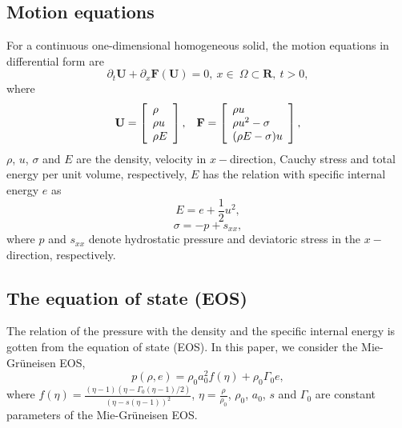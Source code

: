 \documentclass{article}
\numberwithin{equation}{section}
\numberwithin{table}{section}
\begin{document}
\subsection{Motion equations}
For  a continuous one-dimensional homogeneous solid, the motion equations  in differential form are
\begin{equation*}
\partial_t \mathbf{{U}} + \partial _x \bm{F}(\mathbf{{U}}) = 0, \   x \in \   \Omega \subset \mathbf{R}, \  t>0,
\end{equation*}
where
\begin{equation}
  \mathbf{U} = \left[ \begin{array}{l}
      \rho \\
      \rho u \\
      \rho  E \\
    \end{array}
  \right],
  \hspace{0.3cm}
  \mathbf{F} = \left[ \begin{array}{l}
      \rho u \\
      \rho u^2 -\sigma\\
      (\rho E -\sigma)u\\
  \end{array} \right],
\end{equation}
$\rho$, $u$, $\sigma$ and $E$ are  the density, velocity in $x-$direction, Cauchy stress and total energy per unit volume, respectively, $E$ has the relation with specific internal energy $e$ as
\begin{equation} \label{te1}
  E = e+\frac{1}{2}u^2,
\end{equation}
\begin{equation}\label{sigma1}
  \sigma = -p +s_{xx},
\end{equation}
where $p$ and $s_{xx}$ denote hydrostatic pressure and deviatoric stress in the $x-$ direction, respectively.

\subsection{The equation of state (EOS)}

The relation of the pressure with  the density and the specific internal energy is gotten from the equation of state (EOS). In this paper, we consider the Mie-Gr\"uneisen EOS,
\begin{equation}\label{eq:mie}
  p(\rho,e) = \rho_0 a_0^2f(\eta)+ \rho_0 \Gamma_0 e,
\end{equation}
where $f(\eta) = \frac{(\eta-1)(\eta-\Gamma_0(\eta-1)/2)}{(\eta-s(\eta-1))^2}$, $\eta = \frac{\rho}{\rho_0}$, $\rho_0$, $a_0$, $s$ and $\Gamma_0$ are constant parameters of the Mie-Gr\"uneisen EOS.
\end{document}

